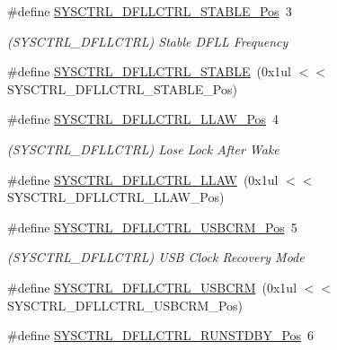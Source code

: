 \begin{DoxyCompactItemize}
\item 
\#define \mbox{\hyperlink{group___s_a_m_d21___s_y_s_c_t_r_l_gaf84f86aae377f643ecde9ee758adda33}{S\+Y\+S\+C\+T\+R\+L\+\_\+\+D\+F\+L\+L\+C\+T\+R\+L\+\_\+\+S\+T\+A\+B\+L\+E\+\_\+\+Pos}}~3
\begin{DoxyCompactList}\small\item\em (S\+Y\+S\+C\+T\+R\+L\+\_\+\+D\+F\+L\+L\+C\+T\+RL) Stable D\+F\+LL Frequency \end{DoxyCompactList}\item 
\#define \mbox{\hyperlink{group___s_a_m_d21___s_y_s_c_t_r_l_gac676acf8a4c3e3ee035b011c73dc646d}{S\+Y\+S\+C\+T\+R\+L\+\_\+\+D\+F\+L\+L\+C\+T\+R\+L\+\_\+\+S\+T\+A\+B\+LE}}~(0x1ul $<$$<$ S\+Y\+S\+C\+T\+R\+L\+\_\+\+D\+F\+L\+L\+C\+T\+R\+L\+\_\+\+S\+T\+A\+B\+L\+E\+\_\+\+Pos)
\item 
\#define \mbox{\hyperlink{group___s_a_m_d21___s_y_s_c_t_r_l_ga7d1323c3dbfabaddeb9cfb3bc3eea099}{S\+Y\+S\+C\+T\+R\+L\+\_\+\+D\+F\+L\+L\+C\+T\+R\+L\+\_\+\+L\+L\+A\+W\+\_\+\+Pos}}~4
\begin{DoxyCompactList}\small\item\em (S\+Y\+S\+C\+T\+R\+L\+\_\+\+D\+F\+L\+L\+C\+T\+RL) Lose Lock After Wake \end{DoxyCompactList}\item 
\#define \mbox{\hyperlink{group___s_a_m_d21___s_y_s_c_t_r_l_gac7aa3c977a832e00c4fe55b8cddfc161}{S\+Y\+S\+C\+T\+R\+L\+\_\+\+D\+F\+L\+L\+C\+T\+R\+L\+\_\+\+L\+L\+AW}}~(0x1ul $<$$<$ S\+Y\+S\+C\+T\+R\+L\+\_\+\+D\+F\+L\+L\+C\+T\+R\+L\+\_\+\+L\+L\+A\+W\+\_\+\+Pos)
\item 
\#define \mbox{\hyperlink{group___s_a_m_d21___s_y_s_c_t_r_l_ga66e618f0d6acae08ae0f136e0af74d1f}{S\+Y\+S\+C\+T\+R\+L\+\_\+\+D\+F\+L\+L\+C\+T\+R\+L\+\_\+\+U\+S\+B\+C\+R\+M\+\_\+\+Pos}}~5
\begin{DoxyCompactList}\small\item\em (S\+Y\+S\+C\+T\+R\+L\+\_\+\+D\+F\+L\+L\+C\+T\+RL) U\+SB Clock Recovery Mode \end{DoxyCompactList}\item 
\#define \mbox{\hyperlink{group___s_a_m_d21___s_y_s_c_t_r_l_gaba565b73e3da33407af06c564363ea31}{S\+Y\+S\+C\+T\+R\+L\+\_\+\+D\+F\+L\+L\+C\+T\+R\+L\+\_\+\+U\+S\+B\+C\+RM}}~(0x1ul $<$$<$ S\+Y\+S\+C\+T\+R\+L\+\_\+\+D\+F\+L\+L\+C\+T\+R\+L\+\_\+\+U\+S\+B\+C\+R\+M\+\_\+\+Pos)
\item 
\#define \mbox{\hyperlink{group___s_a_m_d21___s_y_s_c_t_r_l_ga6369d06f531ceb65772ec505cbda3b90}{S\+Y\+S\+C\+T\+R\+L\+\_\+\+D\+F\+L\+L\+C\+T\+R\+L\+\_\+\+R\+U\+N\+S\+T\+D\+B\+Y\+\_\+\+Pos}}~6
$$
\end{DoxyCompactItemize}
